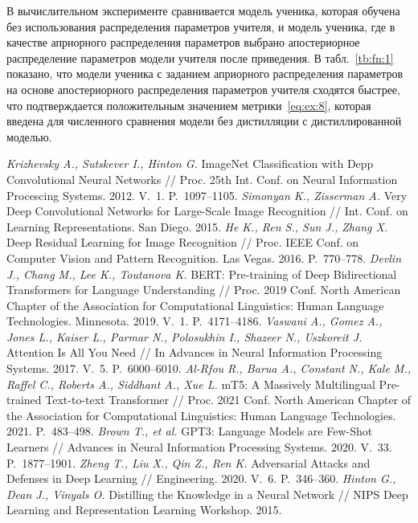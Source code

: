 \documentclass[12pt]{a&t}
\begin{document}
В вычислительном эксперименте сравнивается модель ученика, которая обучена без использования распределения параметров учителя, и модель ученика, где в качестве априорного распределения параметров выбрано апостериорное распределение параметров модели учителя после приведения. В табл.~\ref{tb:fn:1} показано, что модели ученика с заданием априорного распределения параметров на основе апостериорного распределения параметров учителя сходятся быстрее, что подтверждается положительным значением метрики~\eqref{eq:ex:8}, которая введена для численного сравнения модели без дистилляции с  дистиллированной моделью.

\begin{thebibliography}{10}
	\textit{Krizhevsky A., Sutskever I., Hinton G.} ImageNet Classification with Depp Convolutional Neural Networks // Proc. 25th Int. Conf. on Neural Information Procescing Systems. 2012. V.~1. P.~1097--1105.
	\textit{Simonyan K., Zisserman A.} Very Deep Convolutional Networks for Large-Scale Image Recognition // Int. Conf. on Learning Representations. San Diego. 2015.
	\textit{He K., Ren S., Sun J., Zhang X.} Deep Residual Learning for Image Recognition // Proc. IEEE Conf. on Computer Vision and Pattern Recognition. Las Vegas. 2016. P.~770--778.
   \textit{Devlin J., Chang M., Lee K., Toutanova K.} BERT: Pre-training of Deep Bidirectional Transformers for Language Understanding // Proc. 2019 Conf. North {A}merican Chapter of the Association for Computational Linguistics: Human Language Technologies. Minnesota. 2019. V.~1. P.~4171--4186.
	\textit{Vaswani A., Gomez A., Jones L., Kaiser L., Parmar N., Polosukhin I., Shazeer N., Uszkoreit J.} Attention Is All You Need // In Advances in Neural Information Processing Systems. 2017. V.~5. P.~6000--6010.
    \textit{Al-Rfou R., Barua A., Constant N., Kale M.,  Raffel C., Roberts A., Siddhant A., Xue L.} mT5: A Massively Multilingual Pre-trained Text-to-text Transformer // Proc. 2021 Conf. North {A}merican Chapter of the Association for Computational Linguistics: Human Language Technologies. 2021. P.~483--498.
    \textit{Brown T., et al.} GPT3: Language Models are Few-Shot Learners // Advances in Neural Information Processing Systems. 2020. V.~33. P.~1877--1901.
	\textit{Zheng T., Liu X., Qin Z., Ren K.} Adversarial Attacks and Defenses in Deep Learning // Engineering. 2020. V.~6. P.~346--360.
    \textit{Hinton G., Dean J., Vinyals O.} Distilling the Knowledge in a Neural Network // NIPS Deep Learning and Representation Learning Workshop. 2015.

\end{thebibliography}
\end{document}
